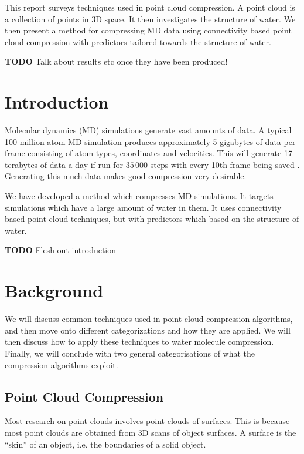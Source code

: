 \documentclass{report}
\begin{document}
This report surveys techniques used in point cloud compression. A point cloud
is a collection of points in 3D space. It then investigates the structure of
water. We then present a method for compressing MD data using connectivity
based point cloud compression with predictors tailored towards the structure
of water.

\textbf{TODO} Talk about results etc once they have been produced!

\tableofcontents

\chapter{Introduction}

Molecular dynamics (MD) simulations generate vast amounts of data. A typical
100-million atom MD simulation produces approximately 5 gigabytes of data per
frame consisting of atom types, coordinates and velocities. This will generate
17 terabytes of data a day if run for $35\,000$ steps with every 10th frame
being saved \citep{omeltchenko2000sls}. Generating this much data makes good
compression very desirable.

We have developed a method which compresses MD simulations. It targets
simulations which have a large amount of water in them. It uses connectivity
based point cloud techniques, but with predictors which based on the structure
of water.

\textbf{TODO} Flesh out introduction

\chapter{Background}

We will discuss common techniques used in point cloud compression algorithms,
and then move onto different categorizations and how they are applied. We will
then discuss how to apply these techniques to water molecule
compression. Finally, we will conclude with two general categorisations of
what the compression algorithms exploit.

\section{Point Cloud Compression}

Most research on point clouds involves point clouds of surfaces. This is
because most point clouds are obtained from 3D scans of object surfaces. A
surface is the ``skin'' of an object, i.e. the boundaries of a solid object.
\end{document}

